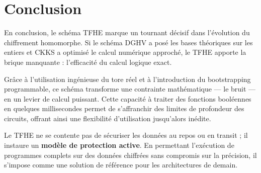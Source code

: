 \section{Conclusion}

En conclusion, le schéma TFHE marque un tournant décisif dans l'évolution du chiffrement homomorphe. Si le schéma DGHV a posé les bases théoriques sur les entiers et CKKS a optimisé le calcul numérique approché, le TFHE apporte la brique manquante : l'efficacité du calcul logique exact.

Grâce à l'utilisation ingénieuse du tore réel et à l'introduction du bootstrapping programmable, ce schéma transforme une contrainte mathématique — le bruit — en un levier de calcul puissant. Cette capacité à traiter des fonctions booléennes en quelques millisecondes permet de s'affranchir des limites de profondeur des circuits, offrant ainsi une flexibilité d'utilisation jusqu'alors inédite.

Le TFHE ne se contente pas de sécuriser les données au repos ou en transit ; il instaure un \textbf{modèle de protection active}. En permettant l'exécution de programmes complets sur des données chiffrées sans compromis sur la précision, il s'impose comme une solution de référence pour les architectures de demain.